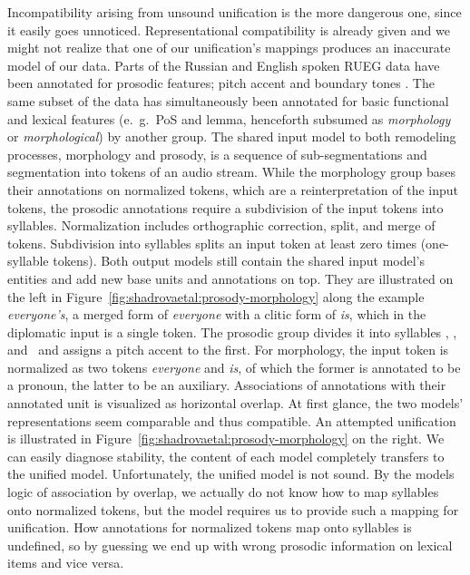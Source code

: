 \documentclass[output=paper,colorlinks,citecolor=brown]{langscibook}
\begin{document}
Incompatibility arising from unsound unification is the more dangerous one, since it easily goes unnoticed.
Representational compatibility is already given and we might not realize that one of our unification's mappings produces an inaccurate model of our data.
Parts of the Russian and English spoken RUEG data have been annotated for prosodic features; pitch accent and boundary tones \parencite{zerbian2022prosody,zerbian_et_al_to_appear}.
The same subset of the data has simultaneously been annotated for basic functional and lexical features (e.~g.\ PoS and lemma, henceforth subsumed as \textit{morphology} or \textit{morphological}) by another group.
The shared input model to both remodeling processes, morphology and prosody, is a sequence of sub-segmentations and segmentation into tokens of an audio stream.
While the morphology group bases their annotations on normalized tokens, which are a reinterpretation of the input tokens,
the prosodic annotations require a subdivision of the input tokens into syllables.
Normalization includes orthographic correction, split, and merge of tokens.
Subdivision into syllables splits an input token at least zero times (one-syllable tokens).
Both output models still contain the shared input model's entities and add new base units and annotations on top.
They are illustrated on the left in Figure~\ref{fig:shadrovaetal:prosody-morphology} along the example \textit{everyone's}, a merged form of \textit{everyone} with a clitic form of \textit{is}, which in the diplomatic input is a single token.
The prosodic group divides it into syllables , , and~ and assigns a pitch accent to the first.
For morphology, the input token is normalized as two tokens \textit{everyone} and \textit{is}, of which the former is annotated to be a pronoun, the latter to be an auxiliary.
Associations of annotations with their annotated unit is visualized as horizontal overlap.
At first glance, the two models' representations seem comparable and thus compatible.
An attempted unification is illustrated in Figure~\ref{fig:shadrovaetal:prosody-morphology} on the right.
We can easily diagnose stability, the content of each model completely transfers to the unified model.
Unfortunately, the unified model is not sound.
By the models logic of association by overlap, we actually do not know how to map syllables onto normalized tokens, but the model requires us to provide such a mapping for unification.
How annotations for normalized tokens map onto syllables is undefined, so by guessing we end up with wrong prosodic information on lexical items and vice versa.
\end{document}
